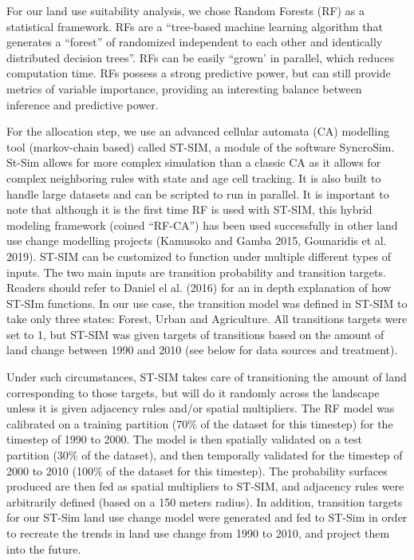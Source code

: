 For our land use suitability analysis, we chose Random Forests (RF) as a statistical framework. RFs are a “tree-based machine learning algorithm that generates a “forest” of randomized independent to each other and identically distributed decision trees”. RFs can be easily “grown’ in parallel, which reduces computation time. RFs possess a strong predictive power, but can still provide metrics of variable importance, providing an interesting balance between inference and predictive power.

For the allocation step, we use an advanced cellular automata (CA) modelling tool (markov-chain based) called ST-SIM, a module of the software SyncroSim. St-Sim allows for more complex simulation than a classic CA as it allows for complex neighboring rules with state and age cell tracking. It is also built to handle large datasets and can be scripted to run in parallel. It is important to note that although it is the first time RF is used with ST-SIM, this hybrid modeling framework (coined “RF-CA”) has been used successfully in other land use change modelling projects (Kamusoko and Gamba 2015, Gounaridis et al. 2019). ST-SIM can be customized to function under multiple different types of inputs. The two main inputs are transition probability and transition targets. Readers should refer to Daniel el al. (2016) for an in depth explanation of how ST-SIm functions. In our use case, the transition model was defined in ST-SIM to take only three states: Forest, Urban and Agriculture. All transitions targets were set to 1, but ST-SIM was given targets of transitions based on the amount of land change between 1990 and 2010 (see below for data sources and treatment).

Under such circumstances, ST-SIM takes care of transitioning the amount of land corresponding to those targets, but will do it randomly across the landscape unless it is given adjacency rules and/or spatial multipliers. The RF model was calibrated on a training partition (70\% of the dataset for this timestep) for the timestep of 1990 to 2000. The model is then spatially validated on a test partition (30\% of the dataset), and then temporally validated for the timestep of 2000 to 2010 (100\% of the dataset for this timestep). The probability surfaces produced are then fed as spatial multipliers to ST-SIM, and adjacency rules were arbitrarily defined (based on a 150 meters radius). In addition, transition targets for our ST-Sim land use change model were generated and fed to ST-Sim in order to recreate the trends in land use change from 1990 to 2010, and project them into the future.\\

